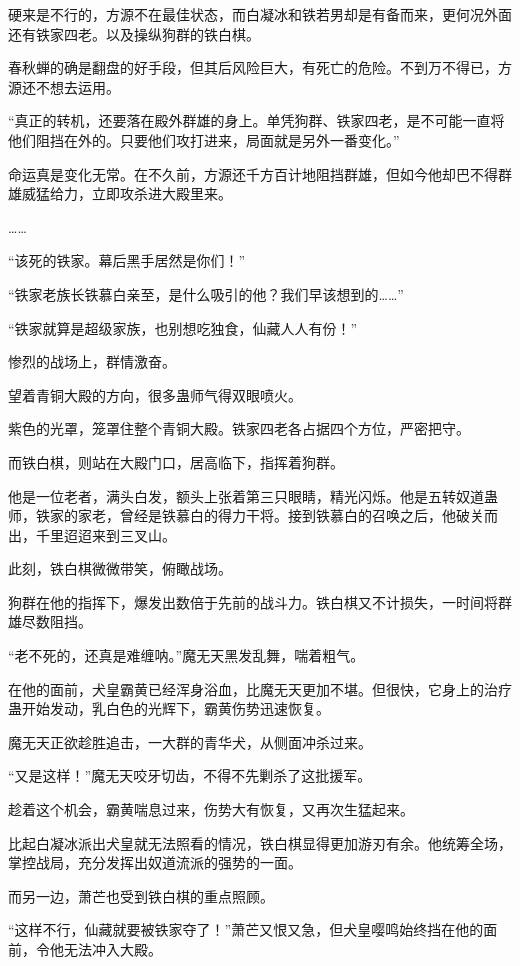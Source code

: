 \begin{this_body}
硬来是不行的，方源不在最佳状态，而白凝冰和铁若男却是有备而来，更何况外面还有铁家四老。以及操纵狗群的铁白棋。

春秋蝉的确是翻盘的好手段，但其后风险巨大，有死亡的危险。不到万不得已，方源还不想去运用。

“真正的转机，还要落在殿外群雄的身上。单凭狗群、铁家四老，是不可能一直将他们阻挡在外的。只要他们攻打进来，局面就是另外一番变化。”

命运真是变化无常。在不久前，方源还千方百计地阻挡群雄，但如今他却巴不得群雄威猛给力，立即攻杀进大殿里来。

……

“该死的铁家。幕后黑手居然是你们！”

“铁家老族长铁慕白亲至，是什么吸引的他？我们早该想到的……”

“铁家就算是超级家族，也别想吃独食，仙藏人人有份！”

惨烈的战场上，群情激奋。

望着青铜大殿的方向，很多蛊师气得双眼喷火。

紫色的光罩，笼罩住整个青铜大殿。铁家四老各占据四个方位，严密把守。

而铁白棋，则站在大殿门口，居高临下，指挥着狗群。

他是一位老者，满头白发，额头上张着第三只眼睛，精光闪烁。他是五转奴道蛊师，铁家的家老，曾经是铁慕白的得力干将。接到铁慕白的召唤之后，他破关而出，千里迢迢来到三叉山。

此刻，铁白棋微微带笑，俯瞰战场。

狗群在他的指挥下，爆发出数倍于先前的战斗力。铁白棋又不计损失，一时间将群雄尽数阻挡。

“老不死的，还真是难缠呐。”魔无天黑发乱舞，喘着粗气。

在他的面前，犬皇霸黄已经浑身浴血，比魔无天更加不堪。但很快，它身上的治疗蛊开始发动，乳白色的光辉下，霸黄伤势迅速恢复。

魔无天正欲趁胜追击，一大群的青华犬，从侧面冲杀过来。

“又是这样！”魔无天咬牙切齿，不得不先剿杀了这批援军。

趁着这个机会，霸黄喘息过来，伤势大有恢复，又再次生猛起来。

比起白凝冰派出犬皇就无法照看的情况，铁白棋显得更加游刃有余。他统筹全场，掌控战局，充分发挥出奴道流派的强势的一面。

而另一边，萧芒也受到铁白棋的重点照顾。

“这样不行，仙藏就要被铁家夺了！”萧芒又恨又急，但犬皇嘤鸣始终挡在他的面前，令他无法冲入大殿。


\end{this_body}
